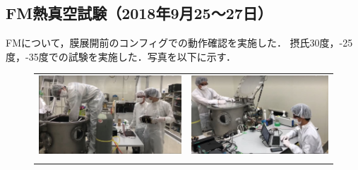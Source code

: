 \subsection{FM熱真空試験（2018年9月25～27日）}

FMについて，膜展開前のコンフィグでの動作確認を実施した．
摂氏30度，-25度，-35度での試験を実施した．写真を以下に示す．
\begin{figure}[H]
	\centering
	\begin{tabular}{cc}
		\begin{minipage}{0.5\hsize}
			\begin{center}
				\includegraphics[width=1\textwidth]{04/fig/4-8-4-1.jpg}
			\end{center}
		\end{minipage}&
		\begin{minipage}{0.5\hsize}
			\begin{center}
				\includegraphics[width=1\textwidth]{04/fig/4-8-4-2.jpg}
			\end{center}
		\end{minipage}\\
		\begin{minipage}{0.5\hsize}

\end{minipage}
\end{tabular}
\end{figure}
